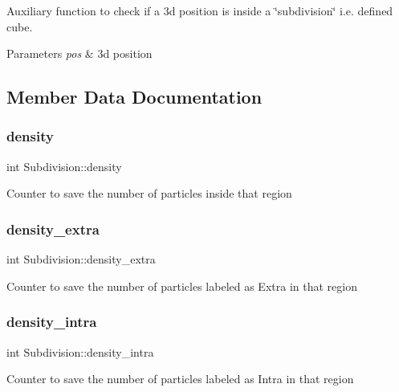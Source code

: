 Auxiliary function to check if a 3d position is inside a \char`\"{}subdivision\char`\"{} i.\+e. defined cube. 


\begin{DoxyParams}{Parameters}
{\em pos} & 3d position \\
\hline
\end{DoxyParams}


\subsection{Member Data Documentation}
\mbox{\label{class_subdivision_a6135c9e9b9a16f2f316d28071dee16c6}} 
\subsubsection{\texorpdfstring{density}{density}}
{\footnotesize\ttfamily int Subdivision\+::density}

Counter to save the number of particles inside that region \mbox{\label{class_subdivision_aa9d564a68a0785998db3e129c6698c0f}} 
\subsubsection{\texorpdfstring{density\+\_\+extra}{density\_extra}}
{\footnotesize\ttfamily int Subdivision\+::density\+\_\+extra}

Counter to save the number of particles labeled as Extra in that region \mbox{\label{class_subdivision_a2944862a3bafcacaf45a935f266f0cf0}} 
\subsubsection{\texorpdfstring{density\+\_\+intra}{density\_intra}}
{\footnotesize\ttfamily int Subdivision\+::density\+\_\+intra}

Counter to save the number of particles labeled as Intra in that region \mbox{\label{class_subdivision_a96ca3e7e744026fef809ade08d861985}} 
